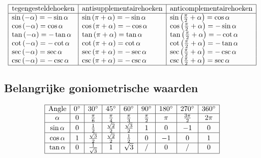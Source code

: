 \documentclass[a5paper]{article}
\begin{document}
\[
\begin{array}{|l|l|l|}
\hline
\text{tegengesteldehoeken} & \text{antisupplementairehoeken} & \text{anticomplementairehoeken} \\
\hline
\sin{\left(-\alpha\right)} = -\sin{\alpha} & \sin{\left(\pi + \alpha\right)} = -\sin{\alpha} & \sin{\left(\frac{\pi}{2} + \alpha\right)} = \cos{\alpha} \\
\cos{\left(-\alpha\right)} = \cos{\alpha} & \cos{\left(\pi + \alpha\right)} = -\cos{\alpha} & \cos{\left(\frac{\pi}{2} + \alpha\right)} = -\sin{\alpha} \\
\tan{\left(-\alpha\right)} = -\tan{\alpha} & \tan{\left(\pi + \alpha\right)} = \tan{\alpha} & \tan{\left(\frac{\pi}{2} + \alpha\right)} = -\cot{\alpha} \\
\cot{\left(-\alpha\right)} = -\cot{\alpha} & \cot{\left(\pi + \alpha\right)} = \cot{\alpha} & \cot{\left(\frac{\pi}{2} + \alpha\right)} = -\tan{\alpha} \\
\sec{\left(-\alpha\right)} = \sec{\alpha} & \sec{\left(\pi + \alpha\right)} = -\sec{\alpha} & \sec{\left(\frac{\pi}{2} + \alpha\right)} = -\csc{\alpha} \\
\csc{\left(-\alpha\right)} = -\csc{\alpha} & \csc{\left(\pi + \alpha\right)} = -\csc{\alpha} & \csc{\left(\frac{\pi}{2} + \alpha\right)} = \sec{\alpha} \\
\hline
\end{array}
\]

\newpage

\subsection{Belangrijke goniometrische waarden}
\[
\begin{array}{|c|c|c|c|c|c|c|c|c|c|}
\hline
\text{Angle} & 0^\circ & 30^\circ & 45^\circ & 60^\circ & 90^\circ & 180^\circ & 270^\circ & 360^\circ \\
\hline
\alpha & 0 & \frac{\pi}{6} & \frac{\pi}{4} & \frac{\pi}{3} & \frac{\pi}{2} & \pi & \frac{3\pi}{2} & 2\pi \\
\hline
\sin \alpha & 0 & \frac{1}{2} & \frac{\sqrt{2}}{2} & \frac{\sqrt{3}}{2} & 1 & 0 & -1 & 0 \\
\hline
\cos \alpha & 1 & \frac{\sqrt{3}}{2} & \frac{\sqrt{2}}{2} & \frac{1}{2} & 0 & -1 & 0 & 1 \\
\hline
\tan \alpha & 0 & \frac{1}{\sqrt{3}} & 1 & \sqrt{3} & / & 0 & / & 0 \\
\hline
\end{array}
\]
\end{document}
